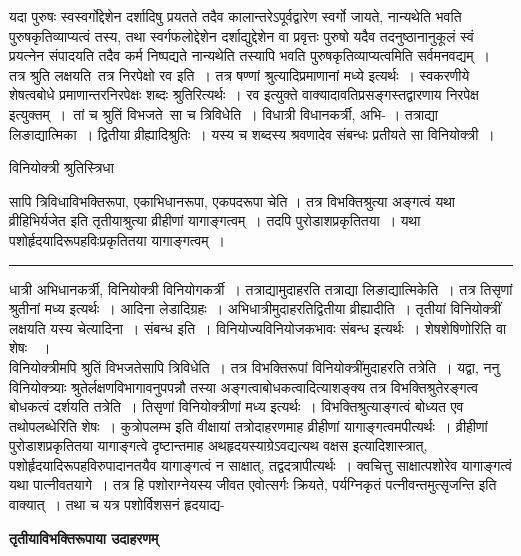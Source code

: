 \documentclass[11pt, openany]{book}
\makeatletter
\def\blfootnote{\gdef\@thefnmark{}\@footnotetext}
\makeatother
\begin{document}
यदा पुरुषः स्वस्वर्गोद्देशेन दर्शादिषु प्रयतते तदैव कालान्तरेऽपूर्वद्वारेण स्वर्गो जायते, नान्यथेति भवति पुरुषकृतिव्याप्यत्वं तस्य, तथा स्वर्गफलोद्देशेन दर्शाद्युद्देशेन वा प्रवृत्तः पुरुषो यदैव तदनुष्ठानानुकूलं स्वं प्रयत्नेन संपादयति तदैव कर्म निष्पद्यते नान्यथेति तस्यापि भवति पुरुषकृतिव्याप्यत्वमिति सर्वमनवद्यम्~।\\

 तत्र श्रुति लक्षयति\textendash\ {\br तत्र निरपेक्षो रव इति~। तत्र} षण्णां श्रुत्यादिप्रमाणानां मध्ये इत्यर्थः~। स्वकरणीये शेषत्वबोधे प्रमाणान्तरनिरपेक्षः शब्दः श्रुतिरित्यर्थः~। रव इत्युक्ते वाक्यादावतिप्रसङ्गस्तद्वारणाय निरपेक्ष इत्युक्तम्~।~तां च श्रुतिं विभजते\textendash\ {\br सा च त्रिविधेति~।} विधात्री विधानकर्त्री, अभि- 
\newpage
\fancyhead[RE]{[ विनियोक्त्री  श्रुतिस्त्रिधा ]}
{\bl{}। तत्राद्या लिङाद्यात्मिका~। द्वितीया व्रीह्यादिश्रुतिः~। यस्य च शब्दस्य श्रवणादेव संबन्धः प्रतीयते सा विनियोक्त्री~।}
\begin{center}
 विनियोक्त्री श्रुतिस्त्रिधा   
\end{center}
 
{\bl सापि त्रिविधा\textendash विभक्तिरूपा, एकाभिधानरूपा, एकपदरूपा चेति । तत्र विभक्तिश्रुत्या अङ्गत्वं यथा {\qtl व्रीहिभिर्यजेत} इति तृतीयाश्रुत्या व्रीहीणां यागाङ्गत्वम्~। तदपि पुरोडाशप्रकृतितया~। यथा पशोर्हृदयादिरूपहविःप्रकृतितया यागाङ्गत्वम्~।}\\
\hrule
\vspace{3mm}
\noindent
धात्री अभिधानकर्त्री, विनियोक्त्री विनियोगकर्त्री~। तत्राद्यामुदाहरति {\br तत्राद्या लिङाद्यात्मिकेति~। तत्र} तिसृणां श्रुतीनां मध्य इत्यर्थः~। आदिना लेडादिग्रहः~।
अभिधात्रीमुदाहरति{\br  द्वितीया व्रीह्यादीति}~। तृतीयां विनियोक्त्रीं लक्षयति {\br यस्य चेत्यादिना~। संबन्ध इति~।} विनियोज्यविनियोजकभावः संबन्ध इत्यर्थः~। शेषशेषिणोरिति वा शेषः\footnotemark~~। \\

 विनियोक्त्रीमपि श्रुतिं विभजते{\br सापि त्रिविधेति~।} तत्र विभक्तिरूपां  विनियोक्त्रींमुदाहरति {\br तत्रेति~।} यद्वा, {\br ननु} विनियोक्त्र्याः श्रुतेर्लक्षणविभागावनुपपन्नौ तस्या अङ्गत्वाबोधकत्वादित्याशङ्क्य तत्र विभक्तिश्रुतेरङ्गत्व बोधकत्वं दर्शयति {\br तत्रेति~।} तिसृणां विनियोक्त्रीणां मध्य इत्यर्थः~। {\br विभक्तिश्रुत्याङ्गत्वं }बोध्यत एव तथोपलब्धेरिति शेषः~। कुत्रोपलम्भ इति वीक्षायां तत्रोदाहरणमाह व्रीहीणां यागाङ्गत्वमपीत्यर्थः~। व्रीहीणां
पुरोडाशप्रकृतितया यागाङ्गत्वे दृष्टान्तमाह {\qt \noindent अथ\textendash  हृदयस्याग्रेऽवद्यत्यथ वक्षस} इत्यादिशास्त्रात्,
पशोर्हृदयादिरूपहविरुपादानतयैव यागाङ्गत्वं न साक्षात्, तद्वदत्रापीत्यर्थः~। क्वचित्तु साक्षात्पशोरेव यागाङ्गत्वं यथा पात्नीवतयागे~। तत्र हि पशोराग्नेयस्य जीवत एवोत्सर्गः क्रियते, {\qt पर्यग्निकृतं पत्नीवन्तमुत्सृजन्ति} इति वाक्यात्~। तथा च यत्र पशोर्विशसनं हृदयाद्य-
\blfootnote{टिप्प \textemdash\ $^{१}$शेष इति पूरणीय इत्यर्थः~।}
\newpage
\fancyhead[LO]{[द्वि०रू०विनि०उदा०]}
  \begin{center}
  \textbf{तृतीयाविभक्तिरूपाया उदाहरणम्}    
  \end{center}
  
\end{document}
